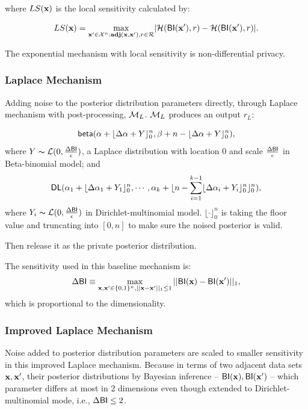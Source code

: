 \documentclass{article}
\begin{document}
where $LS(\textbf{x})$ is the local sensitivity calculated by:

\begin{equation*}
LS(\textbf{x})=\max_{\textbf{x}' \in \mathcal{X}^n:\textbf{adj}(\textbf{x},\textbf{x}'), r\in \mathcal{R}}\lvert \mathcal{H}(\mathsf{BI}(\textbf{x}'), r) - \mathcal{H}(\mathsf{BI}(\textbf{x}'), r)\rvert.
\end{equation*}

The exponential mechanism with local sensitivity is non-differential privacy\cite{dwork2014algorithmic}.



\subsubsection{Laplace Mechanism}
 Adding noise to the posterior distribution parameters directly, through Laplace mechanism with post-processing, $\mathcal{M}_L$. $\mathcal{M}_L$ produces an output $r_L$:

 \[
 \mathsf{beta}(\alpha +  \lfloor{\Delta \alpha + Y}\rfloor^n_0,\beta + n - \lfloor{\Delta \alpha + Y}\rfloor^n_0),
 \] 
 where $Y \thicksim \mathcal{L}(0, \frac{\Delta \mathsf{BI}}{\epsilon})$, a Laplace distribution with location $0$ and scale $\frac{\Delta \mathsf{BI}}{\epsilon}$ in Beta-binomial model; and
 \[
 \mathsf{DL}(\alpha_1 +  \lfloor{\Delta \alpha_1 + Y_1}\rfloor^n_0, \cdots, \alpha_k + \lfloor n - \sum_{i = 1}^{k-1}\lfloor{\Delta \alpha_i + Y_i}\rfloor^n_0 \rfloor^n_0),
 \]
 where $Y_i \thicksim \mathcal{L}(0, \frac{\Delta \mathsf{BI}}{\epsilon})$ in Dirichlet-multinomial model. $\lfloor \cdot \rfloor^n_0$ is taking the floor value and truncating into $[0,n]$ to make sure the noised posterior is valid.

 Then release it as the private posterior distribution.

 The sensitivity used in this baseline mechanism is:
 \[
 \Delta \mathsf{BI} \equiv \max\limits_{\textbf{x}, \textbf{x}' \in \{0,1\}^{n}, ||\textbf{x} - \textbf{x}'||_1 \leq 1} ||\mathsf{BI}(\textbf{x}) - \mathsf{BI}(\textbf{x}')||_1,
 \]
 which is proportional to the dimensionality.


\subsubsection{Improved Laplace Mechanism}

 Noise added to posterior distribution parameters are scaled to smaller sensitivity in this improved Laplace mechanism. Because in terms of two adjacent data sets $\textbf{x}, \textbf{x}'$, their posterior distributions by Bayesian inference -- $\mathsf{BI}(\textbf{x}), \mathsf{BI}(\textbf{x}')$ -- which parameter differs at most in 2 dimensions even though extended to Dirichlet-multinomial mode, i.e., $\Delta \mathsf{BI} \leq 2$. 
\end{document}

